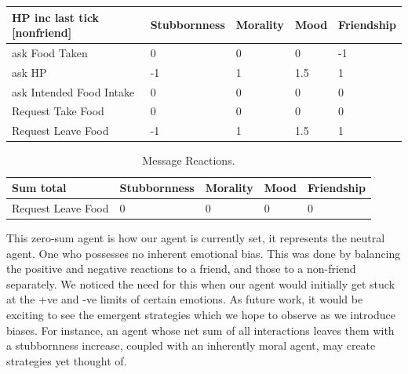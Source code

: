 \begin{table}[htb]
    \centering
    \begin{tabular}{@{}lllll@{}}
    \toprule
    HP inc last tick [nonfriend]    & Stubbornness      & Morality         & Mood             & Friendship     \\ \midrule
    ask Food Taken                  & 0                 & 0                & 0                & -1             \\
    ask HP                          & -1                & 1                & 1.5              & 1              \\
    ask Intended Food Intake        & 0                 & 0                & 0                & 0              \\
    Request Take Food               & 0                 & 0                & 0                & 0              \\
    Request Leave Food              & -1                & 1                & 1.5              & 1              \\ \bottomrule
    \end{tabular}
\end{table}
\begin{table}[htb]
    \centering
    \begin{tabular}{@{}lllll@{}}
    \toprule
    Sum total                       & Stubbornness      & Morality         & Mood             & Friendship     \\ \midrule
    Request Leave Food              & 0                 & 0                & 0                & 0              \\ \bottomrule
    \end{tabular}
    \caption{Message Reactions.}
\end{table}
This zero-sum agent is how our agent is currently set, it represents the neutral agent. One who possesses no inherent emotional bias. This was done by balancing the positive and negative reactions to a friend, and those to a non-friend separately. We noticed the need for this when our agent would initially get stuck at the +ve and -ve limits of certain emotions. As future work, it would be exciting to see the emergent strategies which we hope to observe as we introduce biases. For instance, an agent whose net sum of all interactions leaves them with a stubbornness increase, coupled with an inherently moral agent, may create strategies yet thought of. 


